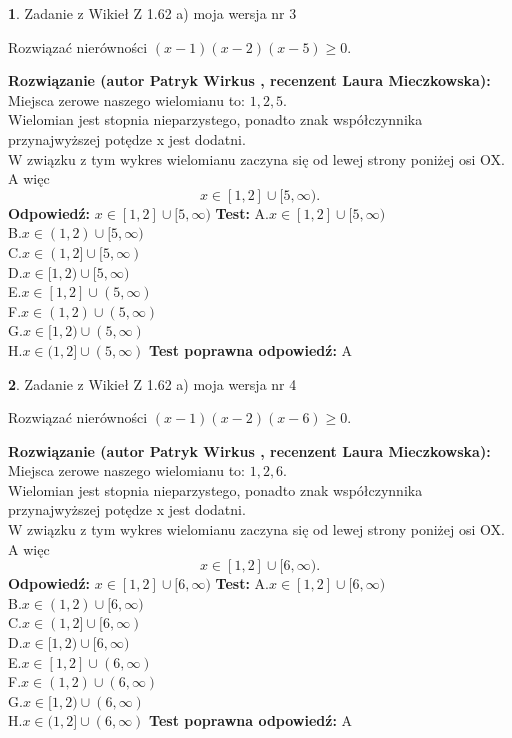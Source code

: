 \documentclass[12pt, a4paper]{article}
\theoremstyle{definition} %
\newtheorem{zad}{}
\newcommand{\zadStart}[1]{\begin{zad}#1\newline}
\newcommand{\zadStop}{\end{zad}}
\newcommand{\rozwStart}[2]{\noindent \textbf{Rozwiązanie (autor #1 , recenzent #2): }\newline}
\newcommand{\rozwStop}{\newline}
\newcommand{\odpStart}{\noindent \textbf{Odpowiedź:}\newline}
\newcommand{\odpStop}{\newline}
\newcommand{\testStart}{\noindent \textbf{Test:}\newline}
\newcommand{\testStop}{\newline}
\newcommand{\kluczStart}{\noindent \textbf{Test poprawna odpowiedź:}\newline}
\newcommand{\kluczStop}{\newline}
\begin{document}
\zadStart{Zadanie z Wikieł Z 1.62 a) moja wersja nr 3}

Rozwiązać nierówności $(x-1)(x-2)(x-5)\ge0$.
\zadStop
\rozwStart{Patryk Wirkus}{Laura Mieczkowska}
Miejsca zerowe naszego wielomianu to: $1, 2, 5$.\\
Wielomian jest stopnia nieparzystego, ponadto znak współczynnika przy\linebreak najwyższej potędze x jest dodatni.\\ W związku z tym wykres wielomianu zaczyna się od lewej strony poniżej osi OX. A więc $$x \in [1,2] \cup [5,\infty).$$
\rozwStop
\odpStart
$x \in [1,2] \cup [5,\infty)$
\odpStop
\testStart
A.$x \in [1,2] \cup [5,\infty)$\\
B.$x \in (1,2) \cup [5,\infty)$\\
C.$x \in (1,2] \cup [5,\infty)$\\
D.$x \in [1,2) \cup [5,\infty)$\\
E.$x \in [1,2] \cup (5,\infty)$\\
F.$x \in (1,2) \cup (5,\infty)$\\
G.$x \in [1,2) \cup (5,\infty)$\\
H.$x \in (1,2] \cup (5,\infty)$
\testStop
\kluczStart
A
\kluczStop



\zadStart{Zadanie z Wikieł Z 1.62 a) moja wersja nr 4}

Rozwiązać nierówności $(x-1)(x-2)(x-6)\ge0$.
\zadStop
\rozwStart{Patryk Wirkus}{Laura Mieczkowska}
Miejsca zerowe naszego wielomianu to: $1, 2, 6$.\\
Wielomian jest stopnia nieparzystego, ponadto znak współczynnika przy\linebreak najwyższej potędze x jest dodatni.\\ W związku z tym wykres wielomianu zaczyna się od lewej strony poniżej osi OX. A więc $$x \in [1,2] \cup [6,\infty).$$
\rozwStop
\odpStart
$x \in [1,2] \cup [6,\infty)$
\odpStop
\testStart
A.$x \in [1,2] \cup [6,\infty)$\\
B.$x \in (1,2) \cup [6,\infty)$\\
C.$x \in (1,2] \cup [6,\infty)$\\
D.$x \in [1,2) \cup [6,\infty)$\\
E.$x \in [1,2] \cup (6,\infty)$\\
F.$x \in (1,2) \cup (6,\infty)$\\
G.$x \in [1,2) \cup (6,\infty)$\\
H.$x \in (1,2] \cup (6,\infty)$
\testStop
\kluczStart
A
\kluczStop
\end{document}
